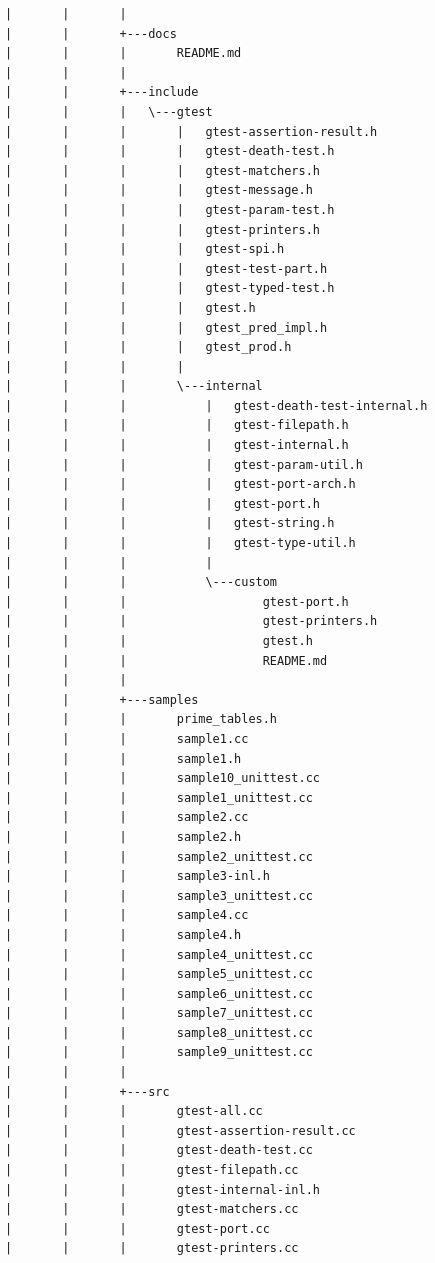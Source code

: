 \documentclass[a4paper,12pt]{article}
\begin{document}
\begin{verbatim}
|       |       |       
|       |       +---docs
|       |       |       README.md
|       |       |       
|       |       +---include
|       |       |   \---gtest
|       |       |       |   gtest-assertion-result.h
|       |       |       |   gtest-death-test.h
|       |       |       |   gtest-matchers.h
|       |       |       |   gtest-message.h
|       |       |       |   gtest-param-test.h
|       |       |       |   gtest-printers.h
|       |       |       |   gtest-spi.h
|       |       |       |   gtest-test-part.h
|       |       |       |   gtest-typed-test.h
|       |       |       |   gtest.h
|       |       |       |   gtest_pred_impl.h
|       |       |       |   gtest_prod.h
|       |       |       |   
|       |       |       \---internal
|       |       |           |   gtest-death-test-internal.h
|       |       |           |   gtest-filepath.h
|       |       |           |   gtest-internal.h
|       |       |           |   gtest-param-util.h
|       |       |           |   gtest-port-arch.h
|       |       |           |   gtest-port.h
|       |       |           |   gtest-string.h
|       |       |           |   gtest-type-util.h
|       |       |           |   
|       |       |           \---custom
|       |       |                   gtest-port.h
|       |       |                   gtest-printers.h
|       |       |                   gtest.h
|       |       |                   README.md
|       |       |                   
|       |       +---samples
|       |       |       prime_tables.h
|       |       |       sample1.cc
|       |       |       sample1.h
|       |       |       sample10_unittest.cc
|       |       |       sample1_unittest.cc
|       |       |       sample2.cc
|       |       |       sample2.h
|       |       |       sample2_unittest.cc
|       |       |       sample3-inl.h
|       |       |       sample3_unittest.cc
|       |       |       sample4.cc
|       |       |       sample4.h
|       |       |       sample4_unittest.cc
|       |       |       sample5_unittest.cc
|       |       |       sample6_unittest.cc
|       |       |       sample7_unittest.cc
|       |       |       sample8_unittest.cc
|       |       |       sample9_unittest.cc
|       |       |       
|       |       +---src
|       |       |       gtest-all.cc
|       |       |       gtest-assertion-result.cc
|       |       |       gtest-death-test.cc
|       |       |       gtest-filepath.cc
|       |       |       gtest-internal-inl.h
|       |       |       gtest-matchers.cc
|       |       |       gtest-port.cc
|       |       |       gtest-printers.cc

\end{verbatim}
\end{document}
